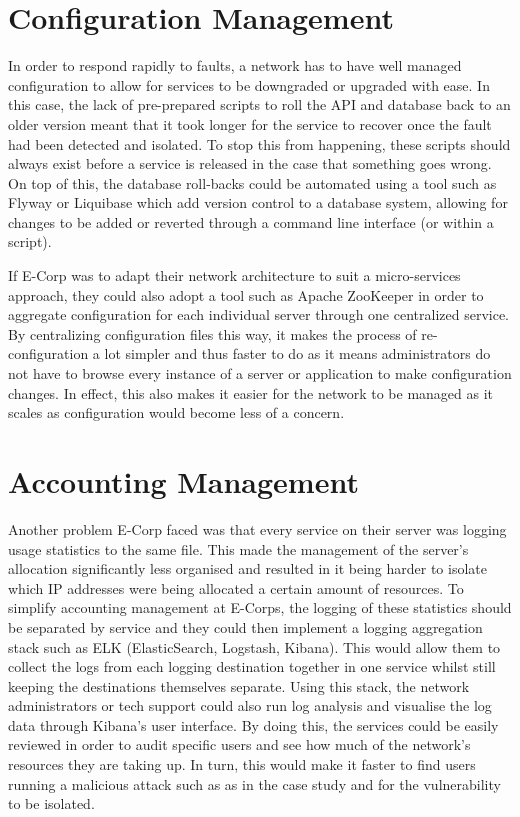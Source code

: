\documentclass[]{report}
\begin{document}
\section*{Configuration Management}

In order to respond rapidly to faults, a network has to have well managed configuration to allow for services to be downgraded or upgraded with ease. In this case, the lack of pre-prepared scripts to roll the API and database back to an older version meant that it took longer for the service to recover once the fault had been detected and isolated. To stop this from happening, these scripts should always exist before a service is released in the case that something goes wrong. On top of this, the database roll-backs could be automated using a tool such as Flyway or Liquibase which add version control to a database system, allowing for changes to be added or reverted through a command line interface (or within a script).

If E-Corp was to adapt their network architecture to suit a micro-services approach, they could also adopt a tool such as Apache ZooKeeper in order to aggregate configuration for each individual server through one centralized service. By centralizing configuration files this way, it makes the process of re-configuration a lot simpler and thus faster to do as it means administrators do not have to browse every instance of a server or application to make configuration changes. In effect, this also makes it easier for the network to be managed as it scales as configuration would become less of a concern. 

\section*{Accounting Management}
Another problem E-Corp faced was that every service on their server was logging usage statistics to the same file. This made the management of the server's allocation significantly less organised and resulted in it being harder to isolate which IP addresses were being allocated a certain amount of resources. To simplify accounting management at E-Corps, the logging of these statistics should be separated by service and they could then implement a logging aggregation stack such as ELK (ElasticSearch, Logstash, Kibana). This would allow them to collect the logs from each logging destination together in one service whilst still keeping the destinations themselves separate. Using this stack, the network administrators or tech support could also run log analysis and visualise the log data through Kibana's user interface. By doing this, the services could be easily reviewed in order to audit specific users and see how much of the network's resources they are taking up. In turn, this would make it faster to find users running a malicious attack such as as in the case study and for the vulnerability to be isolated.
\end{document}
